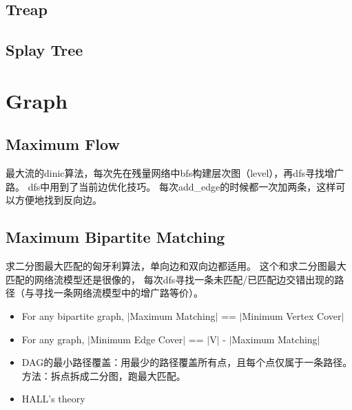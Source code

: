 \documentclass[twoside, UTF8]{article}
\begin{document}
		\subsection{Treap}
			
		\subsection{Splay Tree}
			
	\newpage
	\section{Graph}
		\subsection{Maximum Flow}
			\begin{flushleft}
				最大流的dinic算法，每次先在残量网络中bfs构建层次图（level），再dfs寻找增广路。
				\linebreak dfs中用到了当前边优化技巧。
				\linebreak 每次add\_edge的时候都一次加两条，这样可以方便地找到反向边。
			\end{flushleft}
			
			
		\newpage
		\subsection{Maximum Bipartite Matching}
			\begin{flushleft}
				求二分图最大匹配的匈牙利算法，单向边和双向边都适用。
				\linebreak 这个和求二分图最大匹配的网络流模型还是很像的，
				\linebreak 每次dfs寻找一条未匹配/已匹配边交错出现的路径（与寻找一条网络流模型中的增广路等价）。
			\end{flushleft}
			\begin{itemize}
				\item For any bipartite graph, $|$Maximum Matching$|$ == $|$Minimum Vertex Cover$|$
				\item For any graph, $|$Minimum Edge Cover$|$ == $|$V$|$ - $|$Maximum Matching$|$
				\item DAG的最小路径覆盖：用最少的路径覆盖所有点，且每个点仅属于一条路径。方法：拆点拆成二分图，跑最大匹配。
				\item HALL's theory
			\end{itemize}
			
		\newpage
\end{document}
